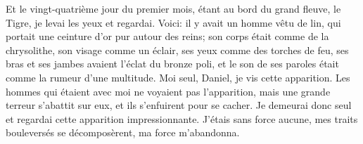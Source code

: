 Et le vingt-quatrième jour du premier mois, étant au bord du grand fleuve, le Tigre,
	je levai les yeux et regardai.
Voici: il y avait un homme vêtu de lin,
	qui portait une ceinture d’or pur autour des reins;
	son corps était comme de la chrysolithe, son visage comme un éclair,
	ses yeux comme des torches de feu,
	ses bras et ses jambes avaient l’éclat du bronze poli,
	et le son de ses paroles était comme la rumeur d’une multitude.
Moi seul, Daniel, je vis cette apparition.
Les hommes qui étaient avec moi ne voyaient pas l’apparition,
	mais une grande terreur s’abattit sur eux, et ils s’enfuirent pour se cacher.
Je demeurai donc seul et regardai cette apparition impressionnante.
	J’étais sans force aucune,
	mes traits bouleversés se décomposèrent, ma force m’abandonna.
